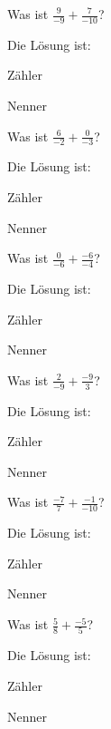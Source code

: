 \documentclass{ximera}
\begin{document}
\begin{shuffle}
\begin{question}
Was ist $\frac{9}{-9} + \frac{7}{-10}$?
\begin{solution}
Die Lösung ist:

Zähler 

Nenner 
\end{solution}
\end{question}


\begin{question}
Was ist $\frac{6}{-2} + \frac{0}{-3}$?
\begin{solution}
Die Lösung ist:

Zähler 

Nenner 
\end{solution}
\end{question}


\begin{question}
Was ist $\frac{0}{-6} + \frac{-6}{-4}$?
\begin{solution}
Die Lösung ist:

Zähler 

Nenner 
\end{solution}
\end{question}


\begin{question}
Was ist $\frac{2}{-9} + \frac{-9}{3}$?
\begin{solution}
Die Lösung ist:

Zähler 

Nenner 
\end{solution}
\end{question}


\begin{question}
Was ist $\frac{-7}{7} + \frac{-1}{-10}$?
\begin{solution}
Die Lösung ist:

Zähler 

Nenner 
\end{solution}
\end{question}


\begin{question}
Was ist $\frac{5}{8} + \frac{-5}{5}$?
\begin{solution}
Die Lösung ist:

Zähler 

Nenner 
\end{solution}
\end{question}



\end{shuffle}
\end{document}
